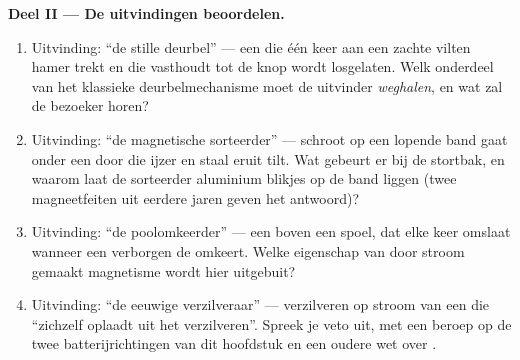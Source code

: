\begin{problem}
\medskip\noindent\textbf{Deel II --- De uitvindingen beoordelen.}
\begin{enumerate}[resume]
  \item Uitvinding: ``de stille deurbel'' --- een
         die één keer aan een zachte vilten hamer
        trekt en die vasthoudt tot de knop wordt losgelaten. Welk
        onderdeel van het klassieke deurbelmechanisme moet de
        uitvinder \emph{weghalen}, en wat zal de bezoeker horen?
  \item Uitvinding: ``de magnetische sorteerder'' --- schroot op een
        lopende band gaat onder een  door die ijzer
        en staal eruit tilt. Wat gebeurt er bij de stortbak, en
        waarom laat de sorteerder aluminium blikjes op de band liggen
        (twee magneetfeiten uit eerdere jaren geven het antwoord)?
  \item Uitvinding: ``de poolomkeerder'' --- een  boven een
        spoel, dat elke keer omslaat wanneer een verborgen
         de  omkeert. Welke eigenschap
        van door stroom gemaakt magnetisme wordt hier uitgebuit?
  \item Uitvinding: ``de eeuwige verzilveraar'' --- verzilveren op
        stroom van een  die ``zichzelf oplaadt uit het
        verzilveren''. Spreek je veto uit, met een beroep op de twee
        batterijrichtingen van dit hoofdstuk en een oudere wet over
        .
\end{enumerate}


\end{problem}
